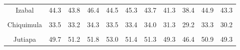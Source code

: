 {\begin{tabular}[t]{ccccccccccc}
Izabal & 44.3 & 43.8 & 46.4 & 44.5 & 45.3 & 43.7 & 41.3 & 38.4 & 44.9 & 43.3\\
\cellcolor[HTML]{B6B3FF}{Zacapa} & \cellcolor[HTML]{B6B3FF}{45.8} & \cellcolor[HTML]{B6B3FF}{46.1} & \cellcolor[HTML]{B6B3FF}{47.7} & \cellcolor[HTML]{B6B3FF}{48.4} & \cellcolor[HTML]{B6B3FF}{48.4} & \cellcolor[HTML]{B6B3FF}{48.3} & \cellcolor[HTML]{B6B3FF}{47.9} & \cellcolor[HTML]{B6B3FF}{45.2} & \cellcolor[HTML]{B6B3FF}{50.0} & \cellcolor[HTML]{B6B3FF}{46.7}\\
Chiquimula & 33.5 & 33.2 & 34.3 & 33.5 & 33.4 & 34.0 & 31.3 & 29.2 & 33.3 & 30.2\\
\cellcolor[HTML]{B6B3FF}{Jalapa} & \cellcolor[HTML]{B6B3FF}{36.2} & \cellcolor[HTML]{B6B3FF}{37.8} & \cellcolor[HTML]{B6B3FF}{37.7} & \cellcolor[HTML]{B6B3FF}{38.9} & \cellcolor[HTML]{B6B3FF}{36.7} & \cellcolor[HTML]{B6B3FF}{37.6} & \cellcolor[HTML]{B6B3FF}{34.7} & \cellcolor[HTML]{B6B3FF}{31.4} & \cellcolor[HTML]{B6B3FF}{36.3} & \cellcolor[HTML]{B6B3FF}{34.2}\\
Jutiapa & 49.7 & 51.2 & 51.8 & 53.0 & 51.4 & 51.3 & 49.3 & 46.4 & 50.9 & 49.3\\
\bottomrule
\end{tabular}}
